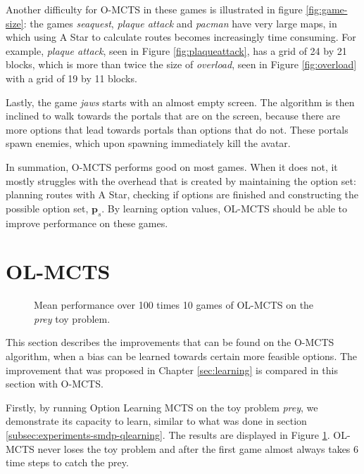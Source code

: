 Another difficulty for O-MCTS in these games is illustrated in figure
\ref{fig:game-size}: the games \textit{seaquest}, \textit{plaque attack} and
\textit{pacman} have very large maps, in which using A Star to calculate routes
becomes increasingly time consuming. For example, \textit{plaque attack}, seen
in Figure \ref{fig:plaqueattack}, has a grid of 24 by 21 blocks, which is more
than twice the size of \textit{overload}, seen in Figure \ref{fig:overload} with
a grid of 19 by 11 blocks.

Lastly, the game \textit{jaws} starts with an almost empty screen. The algorithm
is then inclined to walk towards the portals that are on the screen, because
there are more options that lead towards portals than options that do not. These
portals spawn enemies, which upon spawning immediately kill the avatar. 

In summation, O-MCTS performs good on most games. When it does not, it mostly
struggles with the overhead that is created by maintaining the option set:
planning routes with A Star, checking if options are finished and constructing
the possible option set, $\mathbf{p}_s$. By learning option values, OL-MCTS
should be able to improve performance on these games.

\section{OL-MCTS}
\label{subsec:olmcts}

\begin{figure}
	\centering
	\caption{Mean performance over 100 times 10 games of OL-MCTS on the
	\textit{prey} toy problem.}
	\label{fig:olmctsPrey}
\end{figure}

This section describes the improvements that can be found on the O-MCTS
algorithm, when a bias can be learned towards certain more feasible options. The
improvement that was proposed in Chapter \ref{sec:learning} is compared in this
section with O-MCTS.

Firstly, by running Option Learning MCTS on the toy problem \textit{prey}, we
demonstrate its capacity to learn, similar to what was done in section
\ref{subsec:experiments-smdp-qlearning}. The results are displayed in Figure
\ref{fig:olmctsPrey}. OL-MCTS never loses the toy problem and after the first
game almost always takes 6 time steps to catch the prey. 

